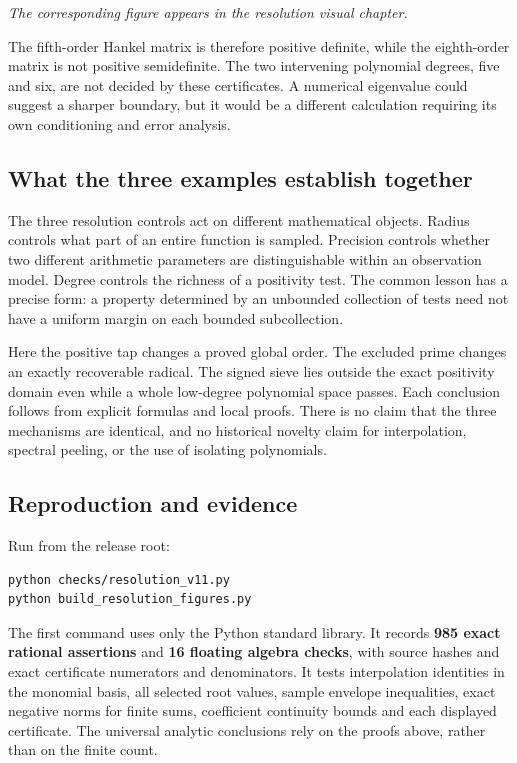 \emph{The corresponding figure appears in the resolution visual
chapter.}

The fifth-order Hankel matrix is therefore positive definite, while the
eighth-order matrix is not positive semidefinite. The two intervening
polynomial degrees, five and six, are not decided by these certificates.
A numerical eigenvalue could suggest a sharper boundary, but it would be
a different calculation requiring its own conditioning and error
analysis.

\hypertarget{v11-resolution_full-what-the-three-examples-establish-together}{%
\subsection{What the three examples establish
together}\label{v11-resolution_full-what-the-three-examples-establish-together}}

The three resolution controls act on different mathematical objects.
Radius controls what part of an entire function is sampled. Precision
controls whether two different arithmetic parameters are distinguishable
within an observation model. Degree controls the richness of a
positivity test. The common lesson has a precise form: a property
determined by an unbounded collection of tests need not have a uniform
margin on each bounded subcollection.

Here the positive tap changes a proved global order. The excluded prime
changes an exactly recoverable radical. The signed sieve lies outside
the exact positivity domain even while a whole low-degree polynomial
space passes. Each conclusion follows from explicit formulas and local
proofs. There is no claim that the three mechanisms are identical, and
no historical novelty claim for interpolation, spectral peeling, or the
use of isolating polynomials.

\hypertarget{v11-resolution_full-reproduction-and-evidence}{%
\subsection{Reproduction and
evidence}\label{v11-resolution_full-reproduction-and-evidence}}

Run from the release root:

\begin{verbatim}
python checks/resolution_v11.py
python build_resolution_figures.py
\end{verbatim}

The first command uses only the Python standard library. It records
\textbf{985 exact rational assertions} and \textbf{16 floating algebra
checks}, with source hashes and exact certificate numerators and
denominators. It tests interpolation identities in the monomial basis,
all selected root values, sample envelope inequalities, exact negative
norms for finite sums, coefficient continuity bounds and each displayed
certificate. The universal analytic conclusions rely on the proofs
above, rather than on the finite count.

